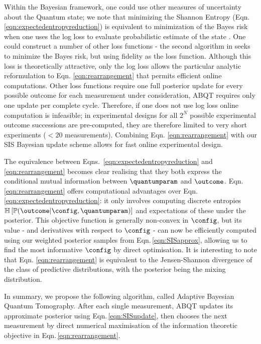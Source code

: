 Within the Bayesian framework, one could use other measures of uncertainty about the Quantum state; we note that minimizing the Shannon Entropy (Eqn. \eqref{eqn:expectedentropyreduction}) is equivalent to minimization of the Bayes risk when one uses the log loss to evaluate probabilistic estimate of the state \citep{Dawid2007}. One could construct a number of other loss functions - the second algorithm in \citep{SelfLearning} seeks to minimize the Bayes risk, but using fidelity as the loss function. Although this loss is theoretically attractive, only the log loss allows the particular analytic reformulation to Eqn. \eqref{eqn:rearrangement} that permits efficient online computations. Other loss functions require one full posterior update for every possible outcome for each measurement under consideration, ABQT requires only one update per complete cycle. Therefore, if one does not use log loss online computation is infeasible; in \citep{SelfLearningExperimental} experimental designs for all $2^N$ possible experimental outcome successions are pre-computed, they are therefore limited to very short experiments ($< 20$ measurements). Combining Eqn. \eqref{eqn:rearrangement} with our SIS Bayesian update scheme allows for fast online experimental design.


The equivalence between Eqns.\, \eqref{eqn:expectedentropyreduction} and \eqref{eqn:rearrangement} becomes clear realising that they both express the conditional mutual information between $\quantumparam$ and $\outcome$. Eqn.\,\eqref{eqn:rearrangement} offers computational advantages over Eqn.\,\eqref{eqn:expectedentropyreduction}: it only involves computing discrete entropies $\mathbb{H}\left[ \mathbb{P}(\outcome|\config,\quantumparam) \right]$ and expectations of these under the posterior. This objective function is generally non-convex in $\config$, but its value - and derivatives with respect to $\config$ - can now be efficiently computed using our weighted posterior samples from Eqn.\,\eqref{eqn:SISapprox}, allowing us to find the most informative $\config$ by direct optimisation. It is interesting to note that Eqn. \eqref{eqn:rearrangement} is equivalent to the Jensen-Shannon divergence of the class of predictive distributions, with the posterior being the mixing distribution.

In summary, we propose the following algorithm, called Adaptive Bayesian Quantum Tomography. After each single measurement, ABQT updates its approximate posterior using Eqn.\,\eqref{eqn:SISupdate}, then chooses the next measurement by direct numerical maximisation of the information theoretic objective in Eqn.\,\eqref{eqn:rearrangement}.

